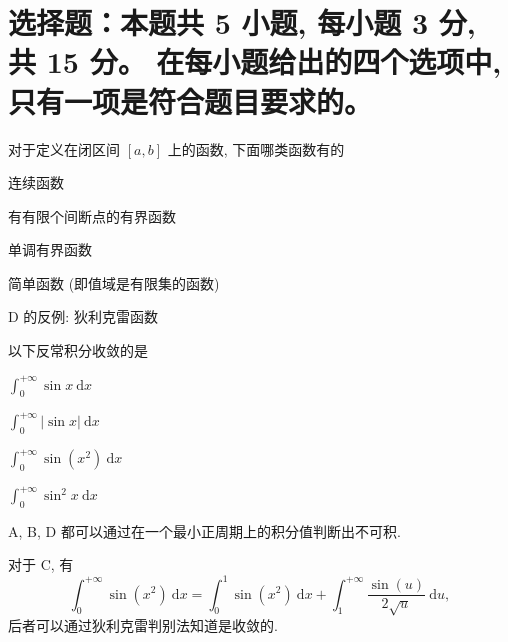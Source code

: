 


\makeexamtitle



\section{%
  选择题：本题共 5 小题, 每小题 3 分, 共 15 分。
  在每小题给出的四个选项中, 只有一项是符合题目要求的。
}


\begin{question}
对于定义在闭区间 $[a, b]$ 上的函数, 下面哪类函数有的 \paren[D]

\begin{choices}
\item 连续函数
\item 有有限个间断点的有界函数
\item 单调有界函数
\item 简单函数 (即值域是有限集的函数)
\end{choices}
\end{question}

\begin{solution}
D 的反例: 狄利克雷函数
\end{solution}

\begin{question}
以下反常积分收敛的是 \paren[C]

\begin{choices}
\item $\displaystyle \int_0^{+\infty} \sin x ~ \mathrm{d} x$
\item $\displaystyle \int_0^{+\infty} |\sin x| ~ \mathrm{d} x$
\item $\displaystyle \int_0^{+\infty} \sin (x^2) ~ \mathrm{d} x$
\item $\displaystyle \int_0^{+\infty} \sin^2 x ~ \mathrm{d} x$
\end{choices}
\end{question}

\begin{solution}
A, B, D 都可以通过在一个最小正周期上的积分值判断出不可积.

对于 C, 有
\[\int_0^{+\infty} \sin (x^2) ~ \mathrm{d} x = \int_0^1 \sin (x^2) ~ \mathrm{d} x + \int_1^{+\infty} \dfrac{\sin (u)}{2\sqrt{u}} ~ \mathrm{d} u,\]
后者可以通过狄利克雷判别法知道是收敛的.
\end{solution}

